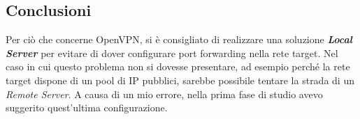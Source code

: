 


\subsection{Conclusioni}
Per ciò che concerne OpenVPN, si è consigliato di realizzare una soluzione \textbf{\textit{Local Server}} per
evitare di dover configurare port forwarding nella rete target. Nel caso in cui questo
problema non si dovesse presentare, ad esempio perché la rete target dispone di un
pool di IP pubblici, sarebbe possibile tentare la strada di un \textit{Remote Server}.
A causa di un mio errore, nella prima fase di studio avevo suggerito quest'ultima configurazione.

